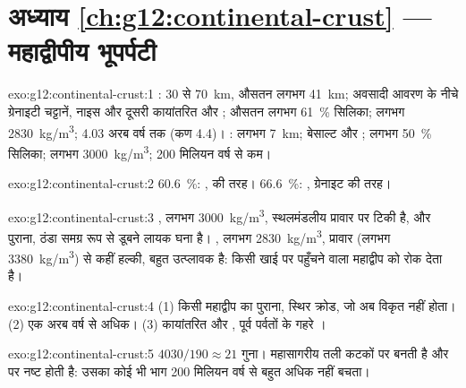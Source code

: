 \section*{अध्याय \ref{ch:g12:continental-crust} --- महाद्वीपीय भूपर्पटी}

\begin{solution}{exo:g12:continental-crust:1}
: 30 से \qty{70}{km}, औसतन लगभग \qty{41}{km};
अवसादी आवरण के नीचे ग्रेनाइटी चट्टानें, नाइस और दूसरी कायांतरित और ; औसतन लगभग \qty{61}{\percent} सिलिका; लगभग
\qty{2830}{kg/m^3}; 4.03 अरब वर्ष तक (कण 4.4)। :
लगभग \qty{7}{km}; बेसाल्ट और ; लगभग \qty{50}{\percent} सिलिका; लगभग
\qty{3000}{kg/m^3}; 200 मिलियन वर्ष से कम।
\end{solution}

\begin{solution}{exo:g12:continental-crust:2}
\qty{60.6}{\percent}: ,  की तरह। \qty{66.6}{\percent}:
, ग्रेनाइट की तरह।
\end{solution}

\begin{solution}{exo:g12:continental-crust:3}
, लगभग \qty{3000}{kg/m^3}, स्थलमंडलीय प्रावार पर टिकी है,
और पुराना, ठंडा  समग्र रूप से डूबने लायक घना है।
, लगभग \qty{2830}{kg/m^3}, प्रावार
(लगभग \qty{3380}{kg/m^3}) से कहीं हल्की, बहुत उत्प्लावक है: किसी खाई पर पहुँचने वाला महाद्वीप
 को रोक देता है।
\end{solution}

\begin{solution}{exo:g12:continental-crust:4}
(1) किसी महाद्वीप का पुराना, स्थिर क्रोड, जो अब विकृत नहीं होता। (2) एक अरब वर्ष से
अधिक। (3) कायांतरित और , पूर्व पर्वतों के
गहरे ।
\end{solution}

\begin{solution}{exo:g12:continental-crust:5}
$4030/190 \approx 21$ गुना। महासागरीय तली कटकों पर बनती है और
 पर नष्ट होती है: उसका कोई भी भाग 200 मिलियन वर्ष से बहुत अधिक
नहीं बचता।
\end{solution}

